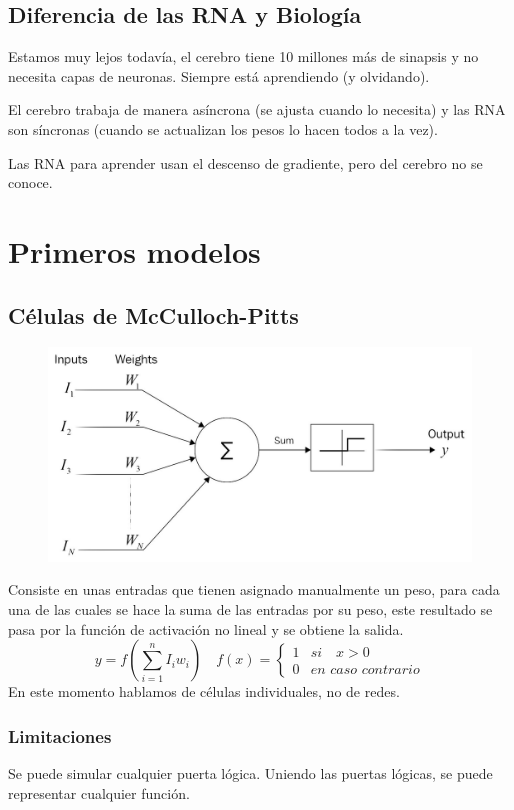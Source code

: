\documentclass[12pt, twoside, openright]{report} %
\begin{document}
\subsection{Diferencia de las RNA y Biología}
Estamos muy lejos todavía, el cerebro tiene 10 millones más de sinapsis y no necesita capas de neuronas. Siempre está aprendiendo (y olvidando).

El cerebro trabaja de manera asíncrona (se ajusta cuando lo necesita) y las RNA son síncronas (cuando se actualizan los pesos lo hacen todos a la vez).

Las RNA para aprender usan el descenso de gradiente, pero del cerebro no se conoce.
\pagebreak

\section{Primeros modelos}
\subsection{Células de McCulloch-Pitts}
\begin{figure}[H]
	{\includegraphics[scale=.25]{McCulloch-Pitts.jpg}}
\end{figure}
Consiste en unas entradas que tienen asignado manualmente un peso, para cada una de las cuales se hace la suma de las entradas por su peso, este resultado se pasa por la función de activación no lineal y se obtiene la salida.
$$y=f\left(\sum_{i=1}^n I_i w_i\right) \quad f (x) = \begin{cases}1 & \textit{si}\quad x> 0\\0 & \textit{en caso contrario}\end{cases}$$
En este momento hablamos de células individuales, no de redes.

\subsubsection{Limitaciones}
Se puede simular cualquier puerta lógica. Uniendo las puertas lógicas, se puede representar cualquier función.
\end{document}
